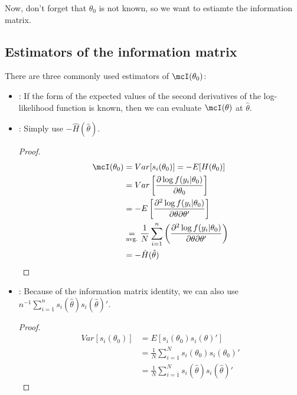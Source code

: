 Now, don't forget that $\theta_0$ is not known, so we want to estiamte the information matrix.

\subsection{Estimators of the information matrix}
There are three commonly used estimators of $\mcI(\theta_0)$:
\begin{itemize}
    \item {}: If the form of the expected values of the second derivatives 
    of the log-likelihood function is known, then we can evaluate $\mcI(\theta)$ at $\hat{\theta}$. 
    \item {}: Simply use $-\hat{H}(\hat{\theta})$.
    \begin{proof}
    \begin{align*}
        \mcI(\theta_0) & = Var[s_i(\theta_0)] = -E[H(\theta_0)]\\
        & = Var\left[\frac{\partial\log f(y_i|\theta_0)}{\partial\theta_0}\right]\\
        & = -E\left[\frac{\partial^2\log f(y_i|\theta_0)}{\partial\theta\partial\theta'}\right]\\
        & \underset{\text{avg.}}{=} \frac{1}{N}\sum_{i=1}^{n}\left(\frac{\partial^2\log f(y_i|\theta_0)}{\partial\theta\partial\theta'}\right)\\
        & = -\hat{H}(\hat{\theta})
    \end{align*}
    \end{proof}
    \item {}: Because of the information matrix identity,
    we can also use $n^{-1}\sum_{i=1}^{n}s_i(\hat{\theta})s_i(\hat{\theta})'$.
    \begin{proof}
    \begin{align*}
        Var[s_i(\theta_0)] & = E[s_i(\theta_0)s_i(\theta)']\\
        & = \frac{1}{N}\sum_{i=1}^{N}s_i(\theta_0)s_i(\theta_0)'\\
        & = \frac{1}{N}\sum_{i=1}^{N}s_i(\hat{\theta})s_i(\hat{\theta})'
    \end{align*}
    \end{proof}
\end{itemize}

